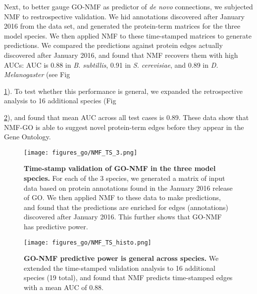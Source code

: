 \documentclass[12pt,a4paper]{report}
\begin{document}
Next, to better gauge GO-NMF as predictor of \textit{de novo} connections, we subjected NMF to restrospective validation. We hid annotations discovered after January 2016 from the data set, and generated the protein-term matrices for the three model species. We then applied NMF to these time-stamped matrices to generate predictions. We compared the predictions against protein edges actually discovered after January 2016, and found that NMF recovers them with high AUCs: AUC is 0.88 in \textit{B. subtillis}, 0.91 in \textit{S. cerevisiae}, and 0.89 in \textit{D. Melanogaster} (see Fig {\ref{fig:nmf_ts}). To test whether this performance is general, we expanded the retrospective analysis to 16 additional species (Fig {\ref{fig:nmf_ts_gen}), and found that mean AUC across all test cases is 0.89. These data show that NMF-GO is able to suggest novel protein-term edges before they appear in the Gene Ontology.

\begin{figure}
\vspace*{-3in}
\begin{minipage}[c][\textheight]{\textwidth}

  \texttt{[image: figures\_go/NMF\_TS\_3.png]}
  \caption[Time-stamp validation of GO-NMF in the three model species.]{\textbf{Time-stamp validation of GO-NMF in the three model species.} For each of the 3 species, we generated a matrix of input data based on protein annotations found in the January 2016 release of GO. We then applied NMF to these data to make predictions, and found that the predictions are enriched for edges (annotations) discovered after January 2016. This further shows that GO-NMF has predictive power.}
  \label{fig:nmf_ts}
\end{minipage}
\end{figure}

\begin{figure}
\vspace*{-3in}
\begin{minipage}[c][\textheight]{\textwidth}
\centering
  \texttt{[image: figures\_go/NMF\_TS\_histo.png]}
  \caption[GO-NMF predictive power is general across species in time-stamped validation.]{\textbf{GO-NMF predictive power is general across species.} We extended the time-stamped validation analysis to 16 additional species (19 total), and found that NMF predicts time-stamped edges with a mean AUC of 0.88.}
  \label{fig:nmf_ts_gen}
  \end{minipage}
\end{figure}

}}
\end{document}
